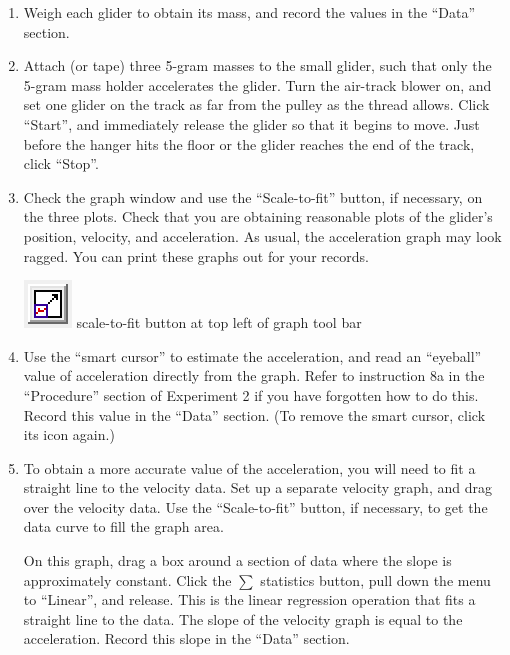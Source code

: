 \begin{enumerate}[label=\arabic*.]

\item Weigh each glider to obtain its mass, and record the values in the ``Data'' section.

\item Attach (or tape) three 5-gram masses to the small glider, such that only the 5-gram mass holder accelerates the glider.  
Turn the air-track blower on, and set one glider on the track as far from the pulley as the thread allows.  Click ``Start'', and immediately release the glider so that it begins to move.  Just before the hanger hits the floor or the glider reaches the end of the track, click ``Stop''.

\item Check the graph window and use the ``Scale-to-fit'' button, if necessary, on the three plots.  Check that you are obtaining reasonable plots of the glider's position, velocity, and acceleration.  As usual, the acceleration graph may look ragged.  You can print these graphs out for your records.

\includegraphics*{imgs/6labs/6Alab/6Aexp3/6A_exp3_ScaleToFit2.png} scale-to-fit button at top left of graph tool bar

\item Use the ``smart cursor'' to estimate the acceleration, and read an ``eyeball'' value of acceleration directly from the graph.  Refer to instruction 8a in the ``Procedure'' section of Experiment 2 if you have forgotten how to do this.  Record this value in the ``Data'' section.  (To remove the smart cursor, click its icon again.)

\item To obtain a more accurate value of the acceleration, you will need to fit a straight line to the velocity data.  Set up a separate velocity graph, and drag over the velocity data.  Use the ``Scale-to-fit'' button, if necessary, to get the data curve to fill the graph area.

On this graph, drag a box around a section of data where the slope is approximately constant.  Click the \(\sum\) statistics button, pull down the menu to ``Linear'', and release.  This is the linear regression operation that fits a straight line to the data.  The slope of the velocity graph is equal to the acceleration.  Record this slope in the ``Data'' section.


\end{enumerate}
